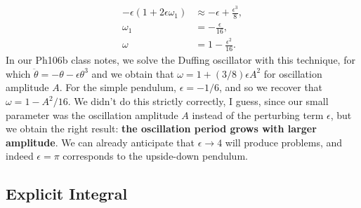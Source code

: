 \documentclass[12pt]{article}
\newcommand*{\p}[1]{\left(#1\right)}
\begin{document}
\begin{align*}
    -\epsilon\p{1 + 2\epsilon \omega_1}
        &\approx -\epsilon + \frac{\epsilon^3}{8},\\
    \omega_1 &= -\frac{\epsilon}{16},\\
    \omega &= 1 - \frac{\epsilon^2}{16}.
\end{align*}
In our Ph106b class notes, we solve the Duffing oscillator with this technique,
for which $\ddot{\theta} = -\theta - \epsilon \theta^3$ and we obtain that
$\omega = 1 + (3/8)\epsilon A^2$ for oscillation amplitude $A$. For the simple
pendulum, $\epsilon = -1/6$, and so we recover that $\omega = 1 - A^2/16$. We
didn't do this strictly correctly, I guess, since our small parameter was the
oscillation amplitude $A$ instead of the perturbing term $\epsilon$, but we
obtain the right result: \textbf{the oscillation period grows with larger
amplitude}. We can already anticipate that $\epsilon \to 4$ will produce
problems, and indeed $\epsilon = \pi$ corresponds to the upside-down pendulum.

\subsection{Explicit Integral}
\end{document}
